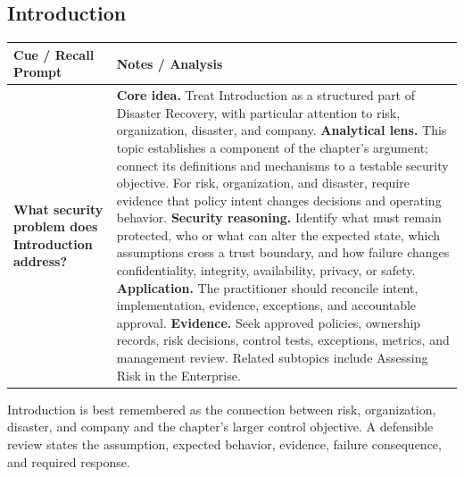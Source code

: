 \documentclass[11pt]{article}
\newcommand{\CornellHeader}{%
\rowcolor{Navy}\color{white}\bfseries Cue / Recall Prompt & \color{white}\bfseries Notes / Analysis\\\hline}
\newcommand{\CornellRow}[2]{%
\cellcolor{CueGray}\RaggedRight\textbf{#1} & \RaggedRight #2\\\hline}
\begin{document}
\subsection*{Introduction}
\begin{longtable}{>{\RaggedRight\arraybackslash}p{}|>{\RaggedRight\arraybackslash}p{}}
\CornellHeader
\CornellRow{What security problem does Introduction address?}{\textbf{Core idea.} Treat Introduction as a structured part of Disaster Recovery, with particular attention to risk, organization, disaster, and company. \textbf{Analytical lens.} This topic establishes a component of the chapter's argument; connect its definitions and mechanisms to a testable security objective. For risk, organization, and disaster, require evidence that policy intent changes decisions and operating behavior. \textbf{Security reasoning.} Identify what must remain protected, who or what can alter the expected state, which assumptions cross a trust boundary, and how failure changes confidentiality, integrity, availability, privacy, or safety. \textbf{Application.} The practitioner should reconcile intent, implementation, evidence, exceptions, and accountable approval. \textbf{Evidence.} Seek approved policies, ownership records, risk decisions, control tests, exceptions, metrics, and management review. Related subtopics include Assessing Risk in the Enterprise.}
\end{longtable}
\begin{topicsummary}
Introduction is best remembered as the connection between risk, organization, disaster, and company and the chapter's larger control objective. A defensible review states the assumption, expected behavior, evidence, failure consequence, and required response.
\end{topicsummary}
\end{document}
